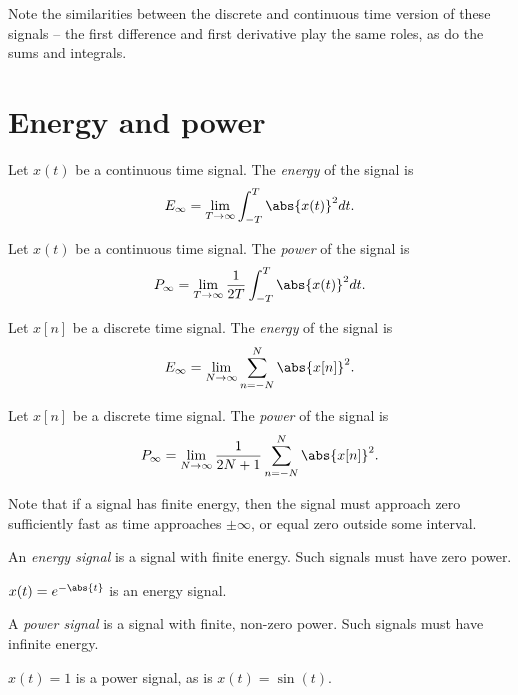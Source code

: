 \documentclass[12pt]{article}
\begin{document}
Note the similarities between the discrete and continuous time version of these signals -- the first difference and first derivative play the same roles, as do the sums and integrals.

\section{Energy and power}

\begin{defn}
    Let $x(t)$ be a continuous time signal. The \emph{energy} of the signal is
    \[E_{\infty} = \lim_{T\to\infty}\int_{-T}^{T}\abs{x(t)}^2dt.\]
\end{defn}

\begin{defn}
    Let $x(t)$ be a continuous time signal. The \emph{power} of the signal is
    \[P_{\infty} = \lim_{T \to \infty}\frac{1}{2T}\int_{-T}^T\abs{x(t)}^2dt.\]
\end{defn}

\begin{defn}
    Let $x[n]$ be a discrete time signal. The \emph{energy} of the signal is
    \[E_{\infty} = \lim_{N\to\infty}\sum_{n=-N}^{N}\abs{x[n]}^2.\]
\end{defn}

\begin{defn}
    Let $x[n]$ be a discrete time signal. The \emph{power} of the signal is
    \[P_{\infty} = \lim_{N \to \infty}\frac{1}{2N+1}\sum_{n=-N}^N\abs{x[n]}^2.\]
\end{defn}

Note that if a signal has finite energy, then the signal must approach zero sufficiently fast as time approaches $\pm\infty$, or equal zero outside some interval.

\begin{defn}
    An \emph{energy signal} is a signal with finite energy. Such signals must have zero power.
\end{defn}

\begin{exmp}
    $x(t) = e^{-\abs{t}}$ is an energy signal.
\end{exmp}

\begin{defn}
    A \emph{power signal} is a signal with finite, non-zero power. Such signals must have infinite energy.
\end{defn}

\begin{exmp}
    $x(t) = 1$ is a power signal, as is $x(t) = \sin(t)$.
\end{exmp}
\end{document}
